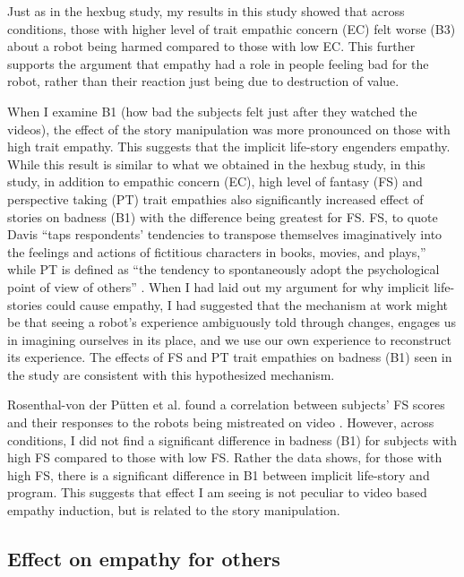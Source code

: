 Just as in the hexbug study, my results in this study showed that across conditions, those with higher level of trait empathic concern (EC) felt worse (B3) about a robot being harmed compared to those with low EC. This further supports the argument that empathy had a role in people feeling bad for the robot, rather than their reaction just being due to destruction of value. 


When I examine B1 (how bad the subjects felt just after they watched the videos), the effect of the story manipulation was more pronounced on those with high trait empathy. This suggests that the implicit life-story engenders empathy. While this result is similar to what we obtained in the hexbug study, in this study, in addition to empathic concern (EC), high level of fantasy (FS) and perspective taking (PT) trait empathies also significantly increased effect of stories on badness (B1) with the difference being greatest for FS. FS, to quote Davis ``taps respondents' tendencies to transpose themselves imaginatively into the feelings and actions of fictitious characters in books, movies, and plays,'' while PT is defined as ``the tendency to spontaneously adopt the psychological point of view of others'' \cite{davis_multidimensional_empathy}. When I had laid out my argument for why implicit life-stories could cause empathy, I had suggested that the mechanism at work might be that seeing a robot's experience ambiguously told through changes, engages us in imagining ourselves in its place, and we use our own experience to reconstruct its experience. The effects of FS and PT trait empathies on badness (B1) seen in the study are consistent with this hypothesized mechanism. 

Rosenthal-von der P{\"u}tten et al. found a correlation between subjects' FS scores and their responses to the robots being mistreated on video \cite{rosenthal_emotional_reaction}. However, across conditions, I did not find a significant difference in badness (B1) for subjects with high FS compared to those with low FS. Rather the data shows, for those with high FS, there is a significant difference in B1 between implicit life-story and program. This suggests that effect I am seeing is not peculiar to video based empathy induction, but is related to the story manipulation. 


\subsection{Effect on empathy for others}

